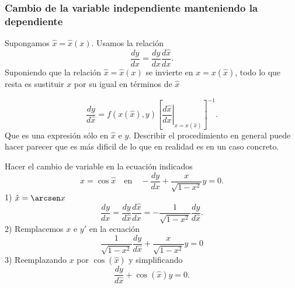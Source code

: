 \subsubsection{Cambio de la variable independiente manteniendo la dependiente}

Supongamos  $\hat{x}=\hat{x}(x)$. Usamos la relación
\[\frac{dy}{dx}=\frac{dy}{d\hat{x}}\frac{d\hat{x}}{dx}.\]
Suponiendo que la relación $\hat{x}=\hat{x}(x)$ se invierte en $x=x(\hat{x})$, todo lo que resta es sustituir  $x$ por su igual en términos de $\hat{x}$

\[\frac{dy}{d\hat{x}}=f(x(\hat{x}),y) \left[\left.\frac{d\hat{x}}{dx}\right|_{x=x(\hat{x})}\right]^{-1}.\]
Que es una expresión sólo en $\hat{x}$ e $y$. Describir el procedimiento  en general puede hacer parecer que es más dificil de lo que en realidad es en un caso concreto.



\begin{ejemplo} Hacer el cambio de variable en la  ecuación indicados
\[x=\cos \hat{x}\quad\text{en}\quad  -\frac{dy}{dx}+\frac{x}{\sqrt{1-x^2}}y=0.\]
1) $\hat{x}=\arcsen x$
\[\frac{dy}{dx}=\frac{dy}{d\hat{x}} \frac{d\hat{x}}{dx}  =-\frac{1}{\sqrt{1-x^2}}\frac{dy}{d\hat{x}}.\]
 2) Remplacemos $x$ e $y'$ en la ecuación
\[\frac{1}{\sqrt{1-x^2}}\frac{dy}{d\hat{x}}+ \frac{x}{\sqrt{1-x^2}}y=0\]
3) Reemplazando $x$ por $\cos(\hat{x})$ y simplificando
\[\frac{dy}{d\hat{x}}+\cos(\hat{x}) y=0.\]

\end{ejemplo}


